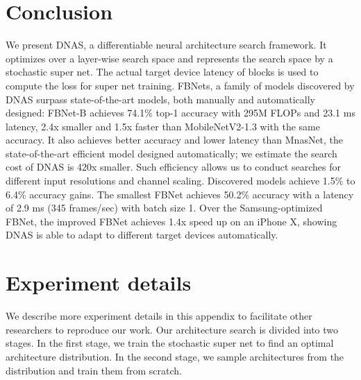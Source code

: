 \documentclass[10pt,twocolumn,letterpaper]{article}
\begin{document}
\section{Conclusion}
We present DNAS, a differentiable neural architecture search framework. It optimizes over a layer-wise search space and represents the search space by a stochastic super net. The actual target device latency of blocks is used to compute the loss for super net training. FBNets, a family of models discovered by DNAS surpass state-of-the-art models, both manually and automatically designed: FBNet-B achieves 74.1\% top-1 accuracy with 295M FLOPs and 23.1 ms latency, 2.4x smaller and 1.5x faster than MobileNetV2-1.3 with the same accuracy. It also achieves better accuracy and lower latency than MnasNet, the state-of-the-art efficient model designed automatically; we estimate the search cost of DNAS is 420x smaller. Such efficiency allows us to conduct searches for different input resolutions and channel scaling. Discovered models achieve 1.5\% to 6.4\% accuracy gains. The smallest FBNet achieves 50.2\% accuracy with a latency of 2.9 ms (345 frames/sec) with batch size 1. Over the Samsung-optimized FBNet, the improved FBNet achieves 1.4x speed up on an iPhone X, showing DNAS is able to adapt to different target devices automatically. 
\clearpage
{\small


}

\clearpage
\appendix
\section{Experiment details}
We describe more experiment details in this appendix to facilitate other researchers to reproduce our work. Our architecture search is divided into two stages. In the first stage, we train the stochastic super net to find an optimal architecture distribution. In the second stage, we sample architectures from the distribution and train them from scratch. 
\end{document}
